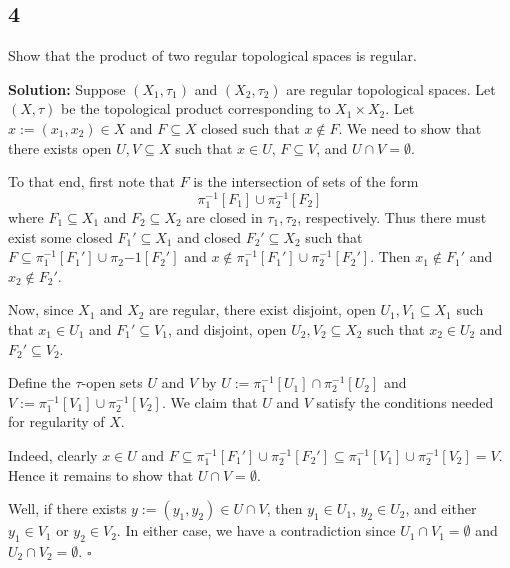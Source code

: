 \documentclass[12pt]{article}
\newcounter{ProofCounter}
\newenvironment{Solution}{\stepcounter{ProofCounter}\textbf{Solution:}}{\hfill$\square$}
\begin{document}
\subsection*{4} 
\begin{tcolorbox}
  Show that the product of two regular topological spaces is regular.
\end{tcolorbox}
\begin{Solution}
  Suppose $(X_1, \tau_1)$ and $(X_2, \tau_2)$ are regular topological spaces. Let $(X, \tau)$ be the topological product corresponding to $X_1 \times
  X_2$. Let $x := (x_1, x_2) \in X$ and $F \subseteq X$ closed such that $x \notin F$. We need to show that there exists open $U, V \subseteq X$ such
  that $x \in U$, $F \subseteq V$, and $U \cap V = \emptyset$. 
  
  To that end, first note that $F$ is the intersection of sets of the form 
  \[
    \pi_1^{-1}[F_1] \cup \pi_2^{-1}[F_2]
  \]
  where $F_1 \subseteq X_1$ and $F_2 \subseteq X_2$ are closed in $\tau_1, \tau_2$, respectively. Thus there must exist some closed $F_1' \subseteq X_1$ and
  closed $F_2' \subseteq X_2$ such that $F \subseteq \pi_1^{-1}[F_1'] \cup \pi_2{-1}[F_2']$ and $x \notin \pi_1^{-1}[F_1'] \cup \pi_2^{-1}[F_2']$.
  Then $x_1 \notin F_1'$ and $x_2 \notin F_2'$. 
  
  Now, since $X_1$ and $X_2$ are regular, there exist disjoint, open $U_1, V_1 \subseteq X_1$ 
  such that $x_1 \in U_1$ and $F_1' \subseteq V_1$, and disjoint, open $U_2, V_2 \subseteq X_2$ such that 
  $x_2 \in U_2$ and $F_2' \subseteq V_2$. 

  Define the $\tau$-open sets $U$ and $V$ by $U := \pi_1^{-1}[U_1] \cap \pi_2^{-1}[U_2]$ and 
  $V := \pi_1^{-1}[V_1] \cup \pi_2^{-1}[V_2]$. We claim that $U$ and $V$ satisfy the conditions needed for regularity of $X$. 
  
  Indeed, clearly $x \in
  U$ and $F \subseteq \pi_{1}^{-1}[F_1'] \cup \pi_2^{-1}[F_2'] \subseteq \pi_1^{-1}[V_1] \cup \pi_2^{-1}[V_2] = V$. Hence it remains to show that $U
  \cap V = \emptyset$.

  Well, if there exists $y := (y_1, y_2) \in U \cap V$, then $y_1 \in U_1$, $y_2 \in U_2$, and either $y_1 \in V_1$ or $y_2 \in V_2$. In either case,
  we have a contradiction since $U_1 \cap V_1 = \emptyset$ and $U_2 \cap V_2 = \emptyset$.
\end{Solution}
\end{document}
